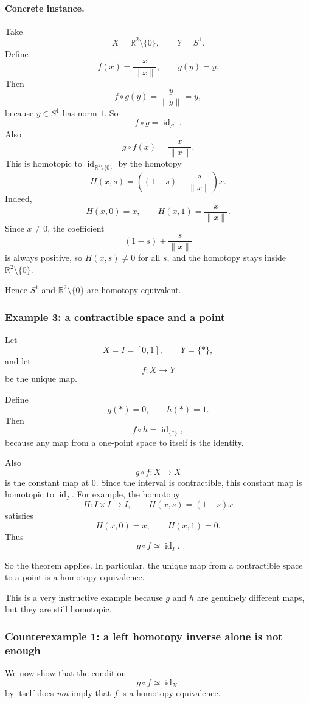 \documentclass[12pt,a4paper]{article}
\theoremstyle{notespace}
\begin{document}
\paragraph{Concrete instance.}
Take
\[
X=\mathbb{R}^2\setminus\{0\},
\qquad
Y=S^1.
\]
Define
\[
f(x)=\frac{x}{\|x\|},
\qquad
g(y)=y.
\]
Then
\[
f\circ g(y)=\frac{y}{\|y\|}=y,
\]
because \(y\in S^1\) has norm \(1\). So
\[
f\circ g=\operatorname{id}_{S^1}.
\]
Also
\[
g\circ f(x)=\frac{x}{\|x\|}.
\]
This is homotopic to \(\operatorname{id}_{\mathbb{R}^2\setminus\{0\}}\) by the homotopy
\[
H(x,s)=\left((1-s)+\frac{s}{\|x\|}\right)x.
\]
Indeed,
\[
H(x,0)=x,
\qquad
H(x,1)=\frac{x}{\|x\|}.
\]
Since \(x\neq 0\), the coefficient
\[
(1-s)+\frac{s}{\|x\|}
\]
is always positive, so \(H(x,s)\neq 0\) for all \(s\), and the homotopy stays inside \(\mathbb{R}^2\setminus\{0\}\).

Hence \(S^1\) and \(\mathbb{R}^2\setminus\{0\}\) are homotopy equivalent.

\subsubsection{Example 3: a contractible space and a point}

Let
\[
X=I=[0,1],
\qquad
Y=\{*\},
\]
and let
\[
f:X\to Y
\]
be the unique map.

Define
\[
g(*)=0,
\qquad
h(*)=1.
\]
Then
\[
f\circ h=\operatorname{id}_{\{*\}},
\]
because any map from a one-point space to itself is the identity.

Also
\[
g\circ f:X\to X
\]
is the constant map at \(0\). Since the interval is contractible, this constant map is homotopic to \(\operatorname{id}_I\). For example, the homotopy
\[
H:I\times I\to I,
\qquad
H(x,s)=(1-s)x
\]
satisfies
\[
H(x,0)=x,
\qquad
H(x,1)=0.
\]
Thus
\[
g\circ f \simeq \operatorname{id}_I.
\]

So the theorem applies. In particular, the unique map from a contractible space to a point is a homotopy equivalence.

This is a very instructive example because \(g\) and \(h\) are genuinely different maps, but they are still homotopic.

\subsubsection{Counterexample 1: a left homotopy inverse alone is not enough}

We now show that the condition
\[
g\circ f \simeq \operatorname{id}_X
\]
by itself does \emph{not} imply that \(f\) is a homotopy equivalence.
\end{document}

